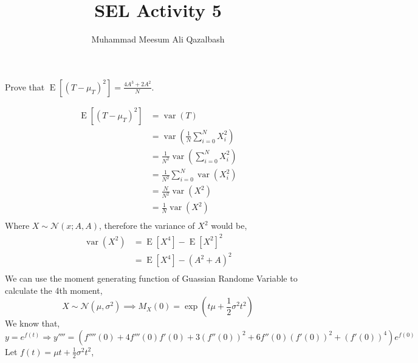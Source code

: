 \documentclass{exam}
\title{SEL Activity 5}
\author{Muhammad Meesum Ali Qazalbash}
\theoremstyle{mytheoremstyle}
\theoremstyle{mytheoremstyle}
\theoremstyle{myproblemstyle}
\begin{document}
\maketitle

\begin{questions}
    \question Prove that \(\displaystyle\operatorname{E}\left[\left(T-\mu_{T}\right)^{2}\right]=\frac{4A^{3}+2A^{2}}{N}\).

    \begin{solution}
        \begin{equation}\label{proof}
            \begin{split}
                \operatorname{E}\left[\left(T-\mu_{T}\right)^{2}\right]&=\operatorname{var}(T)\\
                &=\operatorname{var}\left(\frac{1}{N}\sum_{i=0}^{N}X^{2}_{i}\right)\\
                &=\frac{1}{N^2}\operatorname{var}\left(\sum_{i=0}^{N}X^{2}_{i}\right)\\
                &=\frac{1}{N^2}\sum_{i=0}^{N}\operatorname{var}\left(X^{2}_{i}\right)\\
                &=\frac{N}{N^2}\operatorname{var}\left(X^{2}\right)\\
                &=\frac{1}{N}\operatorname{var}\left(X^{2}\right)\\
            \end{split}
        \end{equation}
        Where \(X\sim\mathcal{N}(x;A,A)\), therefore the variance of \(X^2\) would be,
        \begin{equation*}
            \begin{split}
                \operatorname{var}\left(X^{2}\right)&=\operatorname{E}\left[X^{4}\right]-\operatorname{E}\left[X^2\right]^2\\
                &=\operatorname{E}\left[X^{4}\right]-\left(A^2+A\right)^2\\
            \end{split}
        \end{equation*}
        We can use the moment generating function of Guassian Randome Variable to calculate the 4th moment,
        \[X\sim \mathcal{N}(\mu,\sigma^{2}) \implies M_{X}(0)=\exp{\left(t\mu+\frac{1}{2}\sigma^2t^2\right)}\]
        We know that,
        \[y=e^{f(t)}\Rightarrow y''''=\left(f''''(0)+4f'''(0)f'(0)+3(f''(0))^2+6f''(0)(f'(0))^2+(f'(0))^{4}\right)e^{f(0)}\]
        Let \(f(t)=\mu t+\frac{1}{2}\sigma^{2}t^{2}\),


\end{solution}
\end{questions}
\end{document}
